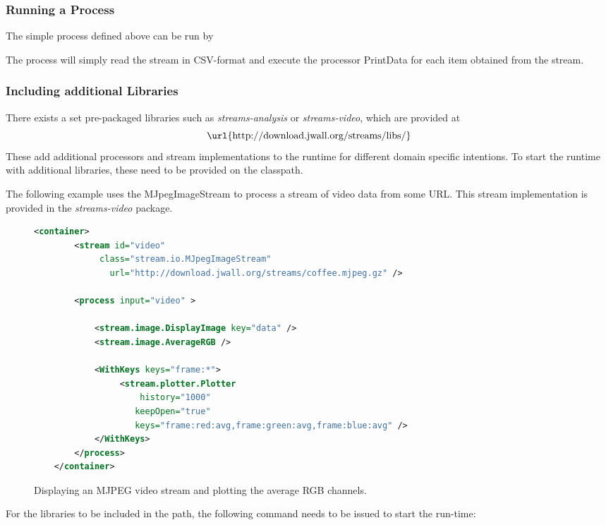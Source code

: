 \subsubsection{Running a \streams Process}
The simple process defined above can be run by

\hspace{4ex}

The process will simply read the stream in CSV-format and execute the
processor {\ttfamily PrintData} for each item obtained from the
stream.

\subsubsection{Including additional Libraries}
There exists a set pre-packaged libraries such as {\em streams-analysis}
or {\em streams-video}, which are provided at
\begin{displaymath}
  \mbox{\url{http://download.jwall.org/streams/libs/}}
\end{displaymath}
These add additional processors and stream implementations to the
\streams runtime for different domain specific intentions. To start
the \streams runtime with additional libraries, these need to be
provided on the classpath.

The following example uses the {\ttfamily MJpegImageStream} to process
a stream of video data from some URL. This stream implementation is
provided in the {\em streams-video} package.
\begin{figure}[h!]
  \centering
  \begin{lstlisting}[language=XML]
    <container>
        <stream id="video"
             class="stream.io.MJpegImageStream"
               url="http://download.jwall.org/streams/coffee.mjpeg.gz" />

        <process input="video" >

            <stream.image.DisplayImage key="data" />
            <stream.image.AverageRGB />

            <WithKeys keys="frame:*">
                 <stream.plotter.Plotter
       		         history="1000"
	                keepOpen="true"
	                keys="frame:red:avg,frame:green:avg,frame:blue:avg" />
            </WithKeys>
        </process>
    </container>
  \end{lstlisting}
  \caption{\label{fig:videoExample}Displaying an MJPEG video stream and plotting the average RGB channels.}
\end{figure}

For the libraries to be included in the path, the following command needs
to be issued to start the \streams run-time:

\hspace{4ex}
